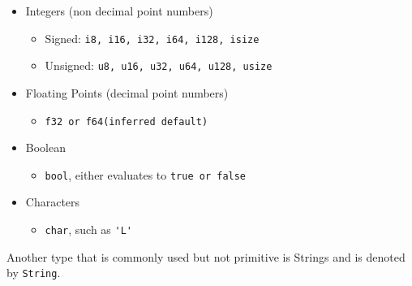 \begin{itemize}
  \item Integers (non decimal point numbers)
  \begin{itemize}
    \item  Signed: \verb!i8, i16, i32, i64, i128, isize!
    \item Unsigned: \verb!u8, u16, u32, u64, u128, usize!
  \end{itemize}
  \item Floating Points (decimal point numbers)
  \begin{itemize}
    \item \verb!f32 or f64(inferred default)!
  \end{itemize}
  \item Boolean
  \begin{itemize}
    \item \verb!bool!, either evaluates to \verb!true or false!
  \end{itemize}
  \item Characters
  \begin{itemize}
    \item \verb!char!, such as \verb!'L'!
  \end{itemize}
\end{itemize}

Another type that is commonly used but not primitive is Strings
and is denoted by \verb!String!. 